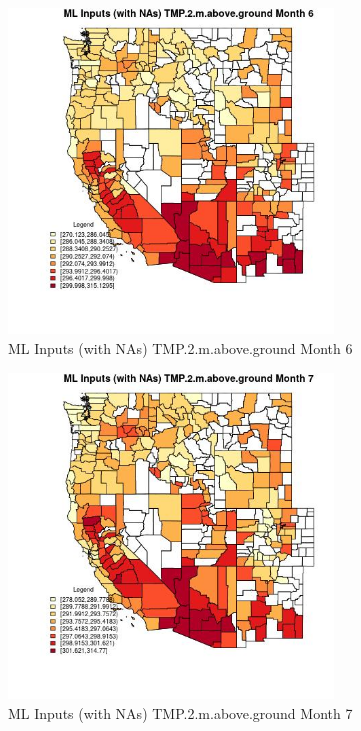 \begin{figure} 
\centering  
\includegraphics[width=0.77\textwidth]{Code_Outputs/Report_ML_input_PM25_Step4_part_f_de_duplicated_aveswNAs_CountyTMP2mabovegroundmedianMonth6.jpg} 
\caption{\label{fig:Report_ML_input_PM25_Step4_part_f_de_duplicated_aveswNAsCountyTMP2mabovegroundmedianMonth6}ML Inputs (with NAs) TMP.2.m.above.ground Month 6} 
\end{figure} 
 

\begin{figure} 
\centering  
\includegraphics[width=0.77\textwidth]{Code_Outputs/Report_ML_input_PM25_Step4_part_f_de_duplicated_aveswNAs_CountyTMP2mabovegroundmedianMonth7.jpg} 
\caption{\label{fig:Report_ML_input_PM25_Step4_part_f_de_duplicated_aveswNAsCountyTMP2mabovegroundmedianMonth7}ML Inputs (with NAs) TMP.2.m.above.ground Month 7} 
\end{figure} 
 

